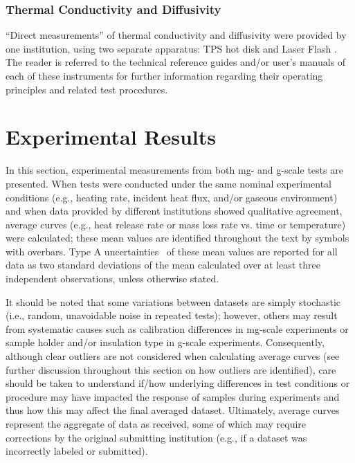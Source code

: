 \documentclass{book}
\begin{document}
\subsection{Thermal Conductivity and Diffusivity}

``Direct measurements'' of thermal conductivity and diffusivity were provided by one institution, using two separate apparatus: TPS hot disk \cite{gustafsson1991transient} and Laser Flash \cite{NeztschLFA}. The reader is referred to the technical reference guides and/or user’s manuals of each of these instruments for further information regarding their operating principles and related test procedures.



\chapter{Experimental Results}
\label{exp_results}

In this section, experimental measurements from both mg- and g-scale tests are presented. When tests were conducted under the same nominal experimental conditions (e.g., heating rate, incident heat flux, and/or gaseous environment) and when data provided by different institutions showed qualitative agreement, average curves (e.g., heat release rate or mass loss rate vs. time or temperature) were calculated; these mean values are identified throughout the text by symbols with overbars. Type A uncertainties~\cite{taylor1994nist} of these mean values are reported for all data as two standard deviations of the mean calculated over at least three independent observations, unless otherwise stated.

It should be noted that some variations between datasets are simply stochastic (i.e., random, unavoidable noise in repeated tests); however, others may result from systematic causes such as calibration differences in mg-scale experiments or sample holder and/or insulation type in g-scale experiments. Consequently, although clear outliers are not considered when calculating average curves (see further discussion throughout this section on how outliers are identified), care should be taken to understand if/how underlying differences in test conditions or procedure may have impacted the response of samples during experiments and thus how this may affect the final averaged dataset. Ultimately, average curves represent the aggregate of data as received, some of which may require corrections by the original submitting institution (e.g., if a dataset was incorrectly labeled or submitted).
\end{document}
